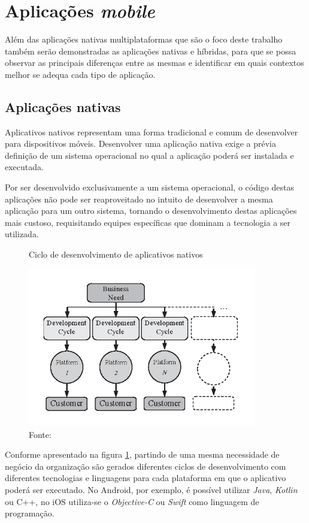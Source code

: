   \section{Aplicações \textit{mobile}}

  Além das aplicações nativas multiplataformas que são o foco deste trabalho também serão demonstradas as aplicações nativas e híbridas, para que se possa observar as principais diferenças entre as mesmas e identificar em quais contextos melhor se adequa cada tipo de aplicação.

    \subsection{Aplicações nativas}
      \label{app_nativas}
  
    Aplicativos nativos representam uma forma tradicional e comum de desenvolver para dispositivos móveis. Desenvolver uma aplicação nativa exige a prévia definição de um sistema operacional no qual a aplicação poderá ser instalada e executada.
    
    Por ser desenvolvido exclusivamente a um sistema operacional, o código destas aplicações não pode ser reaproveitado no intuito de desenvolver a mesma aplicação para um outro sistema, tornando o desenvolvimento destas aplicações mais custoso, requisitando equipes específicas que dominam a tecnologia a ser utilizada. 
    
    \begin{figure}[h]
    \caption{Ciclo de desenvolvimento de aplicativos nativos}
    \centering %
    \includegraphics[width=10cm]{imagem/native-development.png}
    \caption*{Fonte: \cite{Corral2012}}
    \label{figura:native-development}
    \end{figure}
    
    Conforme apresentado na figura \ref{figura:native-development}, partindo de uma mesma necessidade de negócio da organização são gerados diferentes ciclos de desenvolvimento com diferentes tecnologias e linguagens para cada plataforma em que o aplicativo poderá ser executado. No Android, por exemplo, é possível utilizar \textit{Java}, \textit{Kotlin} ou C++, no iOS utiliza-se o \textit{Objective-C} ou \textit{Swift} como linguagem de programação.
    
